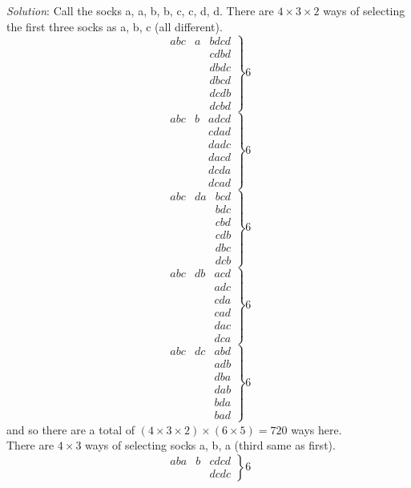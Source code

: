 \documentclass{article}
\begin{document}
\begin{enumerate}[1.]
\textit{Solution}:
Call the socks a, a, b, b, c, c, d, d.
There are $4 \times 3 \times 2$ ways of selecting the first three socks as a, b, c (all different).\\
$$
\left.
\begin{matrix}
abc & a & bdcd\\
& & cdbd\\
&& dbdc \\
&& dbcd  \\
&&dcdb \\
&&dcbd
\end{matrix} \right\} 6
$$
$$
\left.
\begin{matrix}
abc & b & adcd\\
& & cdad\\
&& dadc \\
&& dacd  \\
&&dcda \\
&&dcad
\end{matrix} \right\} 6
$$
$$
\left.
\begin{matrix}
abc & da & bcd\\
& & bdc\\
&& cbd \\
&& cdb  \\
&&dbc \\
&&dcb
\end{matrix} \right\} 6
$$
$$
\left.
\begin{matrix}
abc & db & acd\\
& & adc\\
&& cda \\
&& cad  \\
&&dac \\
&&dca
\end{matrix} \right\} 6
$$
$$
\left.
\begin{matrix}
abc & dc & abd\\
& & adb\\
&& dba \\
&& dab  \\
&&bda \\
&&bad
\end{matrix} \right\} 6
$$
and so there are a total of $(4 \times 3 \times 2) \times (6 \times 5) = 720$ ways here.\\
There are $4 \times 3$ ways of selecting socks a, b, a (third same as first).
$$
\left.
\begin{matrix}
aba & b & cdcd\\
& & dcdc
\end{matrix} \right\} 6
$$
$$
\left.
$$
\end{enumerate}
\end{document}
